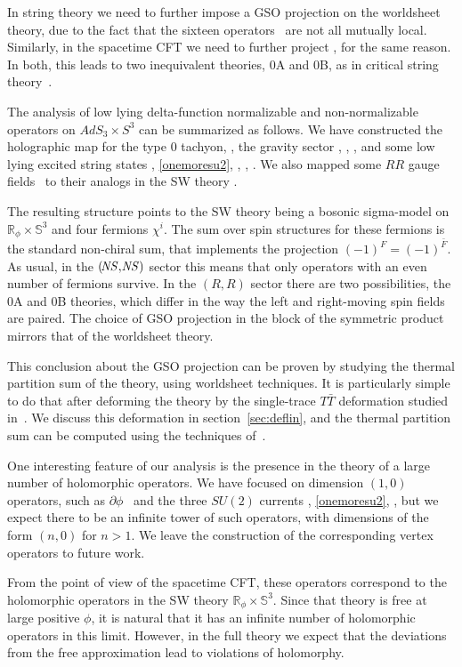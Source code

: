 \documentclass[12pt]{article}
\def\NS{{\it \!NS}}
\newcommand{\bR}{{\mathbb R}}
\newcommand{\bS}{{\mathbb S}}
\numberwithin{equation}{section}
\begin{document}
In string theory we need to further impose a GSO projection on the worldsheet theory, due to the fact that the sixteen operators \dimquarter\ are not all mutually local. Similarly, in the spacetime CFT we need to further project \spacetimerr, for the same reason. In both, this leads to two inequivalent theories, 0A and 0B, as in critical string theory~. 

The analysis of low lying delta-function normalizable and non-normalizable operators on $AdS_3\times S^3$ can be summarized as follows. We have constructed the holographic map for the type 0 tachyon, \ebphivjmws, the gravity sector \dualcurr, \kkbar, \kkbarSW, and some low lying excited string states \dualbb, \eqref{onemoresu2}, \finalthird, \kkbarhh, \fermbil. We also mapped some $RR$ gauge fields \dimquarter\ to their analogs in the SW theory \spacetimerr. 

The resulting structure points to the SW theory being a bosonic sigma-model on $\bR_\phi\times\bS^3$ and four fermions $\chi^i$. The sum over spin structures for these fermions  is the standard non-chiral sum, that implements the projection $(-1)^F=(-1)^{\bar F}$. As usual, in the $(\NS,\NS)$ sector this means that only operators with an even number of fermions survive. In the $(\!R,\!R)$ sector there are two possibilities, the 0A and 0B theories, which differ in the way the left and right-moving spin fields are paired. The choice of GSO projection in the block of the symmetric product mirrors that of the worldsheet theory.

This conclusion about the GSO projection can be proven by studying the thermal partition sum of the theory, using worldsheet techniques. It is particularly simple to do that after deforming the theory by the single-trace $T\bar T$ deformation studied in~. We discuss this deformation in section~\ref{sec:deflin}, and the thermal partition sum can be computed using the techniques of~.

One interesting feature of our analysis is the presence in the theory of a large number of holomorphic operators. We have focused on dimension $(1,0)$ operators, such as $\partial\phi$ \dualbbzero\ and the three $SU(2)$ currents \dualcurr, \eqref{onemoresu2}, \finalthird, but we expect there to be an infinite tower of such operators, with dimensions of the form $(n,0)$ for $n>1$. We leave the construction of the corresponding vertex operators to future work.

From the point of view of the spacetime CFT, these operators correspond to the holomorphic operators in the SW theory $\bR_\phi\times\bS^3$. Since that theory is free at large positive $\phi$, it is natural that it has an infinite number of holomorphic operators in this limit. However, in the full theory we expect that the deviations from the free approximation lead to violations of holomorphy. 
\end{document}
